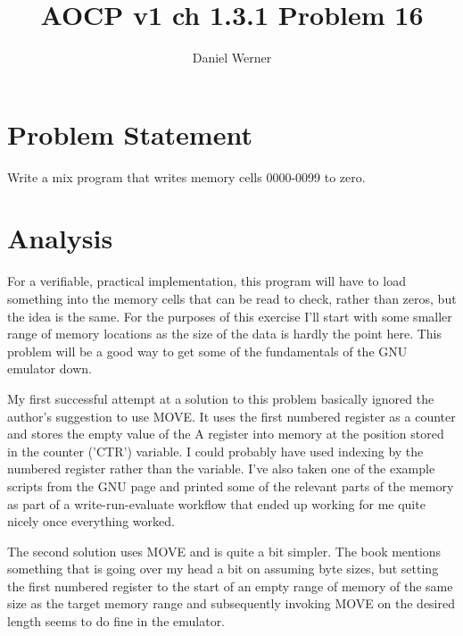\documentclass{article}
\title{AOCP v1 ch 1.3.1 Problem 16}
\author{Daniel Werner}
\begin{document}
\maketitle

\section*{
    Problem Statement
}

Write a mix program that writes memory cells 0000-0099 to zero.

\section*{
    Analysis
}

For a verifiable, practical implementation, this program
 will have to load something into the memory cells that 
 can be read to check, rather than zeros, but the idea is
 the same.  For the purposes of this exercise I'll start
 with some smaller range of memory locations as the size
 of the data is hardly the point here.  This problem will 
 be a good way to get some of the fundamentals of the GNU emulator down.

\par

My first successful attempt at a solution to this problem
basically ignored the author's suggestion to use MOVE.
It uses the first numbered register as a counter and stores
the empty value of the A register into memory at the
position stored in the counter ('CTR') variable.  I could
probably have used indexing by the numbered register rather
than the variable.  I've also taken one of the example
scripts from the GNU page and printed some of the relevant
parts of the memory as part of a write-run-evaluate workflow
that ended up working for me quite nicely once everything
worked.

\par

The second solution uses MOVE and is quite a bit simpler.
The book mentions something that is going over my head a bit
on assuming byte sizes, but setting the first numbered
register to the start of an empty range of memory of the
same size as the target memory range and subsequently
invoking MOVE on the desired length seems to do fine in the
emulator.
\end{document}
